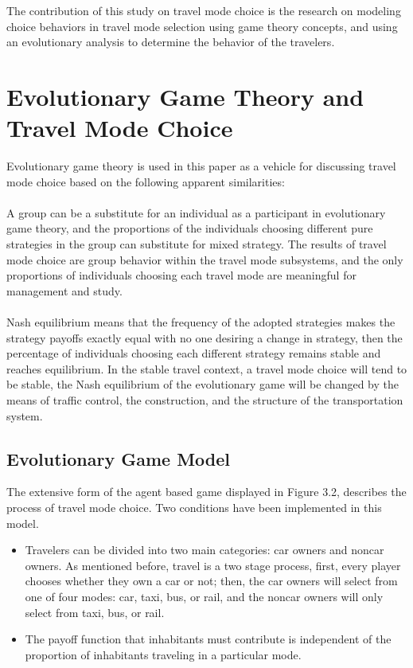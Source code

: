 
The contribution of this study on travel mode choice is the research on modeling choice behaviors in travel mode selection using game theory concepts, and using an evolutionary analysis to determine the behavior of the travelers.
\clearpage

\section{Evolutionary Game Theory and Travel Mode Choice}
Evolutionary game theory is used in this paper as a vehicle for discussing travel mode choice based on the following apparent similarities: 
\paragraph{}A group can be a substitute for an individual as a participant in evolutionary game theory, and the proportions of the individuals choosing different pure strategies in the group can substitute for mixed strategy. The results of travel mode choice are group behavior within the travel mode subsystems, and the only proportions of individuals choosing each travel mode are meaningful for management and study.
\paragraph{}Nash equilibrium means that the frequency of the adopted strategies makes the strategy payoffs exactly equal with no one desiring a change in strategy, then the percentage of individuals choosing each different strategy remains stable and reaches equilibrium. In the stable travel context, a travel mode choice will tend to be stable, the Nash equilibrium of the evolutionary game will be changed by the means of traffic control, the construction, and the structure of the transportation system.

\subsection{Evolutionary Game Model}
The extensive form of the agent based game displayed in Figure 3.2, describes the process of travel mode choice. Two conditions have been implemented in this model.
\begin{itemize}
\item Travelers can be divided into two main categories: car owners and noncar owners. As mentioned before, travel is a two stage process, first, every player chooses whether they own a car or not; then, the car owners will select from one of four modes: car, taxi, bus, or rail, and the noncar owners will only select from taxi, bus, or rail.
\item The payoff function that inhabitants must contribute is independent of the proportion of inhabitants traveling in a particular mode.

\end{itemize}
